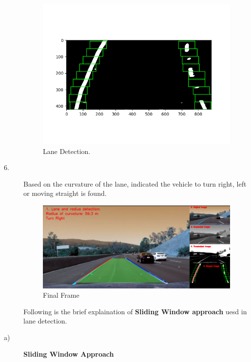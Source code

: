 \documentclass[11pt]{article}
\begin{document}
\begin{description}
\begin{figure}[H]
  \centering
	\includegraphics[height=0.7\textwidth]{thresh1}
	\caption{Lane Detection.} 
\end{figure}

\item[6.] Based on the curvature of the lane, indicated the vehicle to turn right, left or moving straight is found.
\begin{figure}[H]
  \centering
	\includegraphics[height=0.5\textwidth]{main(1)}
	\caption{Final Frame} 
\end{figure}

Following is the brief explaination of \textbf{Sliding Window approach} uesd in lane detection.
\addtolength{\itemindent}{0.80cm}
\item[a)] \textbf{Sliding Window Approach}


\end{description}
\end{document}
